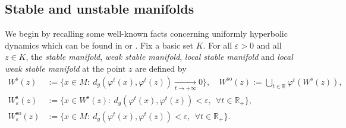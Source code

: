 \documentclass[11pt]{article}
\newcommand{\rs}{\mathrm{s}}
\newcommand{\rso}{\mathrm{so}}
\theoremstyle{definition}
\theoremstyle{plain}
\newcommand{\R}{\mathbb{R}}
\begin{document}
\subsection{Stable and unstable manifolds} We begin by recalling some well-known facts concerning uniformly hyperbolic dynamics which can be found in \cite{katok-hasselblatt} or \cite{dyatlov}. Fix a basic set $K$. For all $\varepsilon > 0$ and all $z \in K$, the \textit{stable manifold}, \textit{weak stable manifold}, \textit{local stable manifold} and \textit{local weak stable manifold} at the point $z$ are defined by
\begin{align*}
W^\rs (z) &:= \{ x \in M: \: d_g(\varphi^t(x), \varphi^t(z)) \underset{t \to+\infty}{\to} 0 \}, \quad W^{\rso} (z):= \bigcup_{t \in \R} \varphi^t \left(W^\rs (z) \right), \\
W_{\varepsilon}^\rs (z) &:= \{ x \in W^\rs (z): \: d_g(\varphi^t(x), \varphi^t(z)) < \varepsilon, \: \: \forall t \in \R_+ \},\\
W_{\varepsilon}^{\rso} (z) &:= \{ x \in M: \: d_g(\varphi^t(x), \varphi^t(z)) < \varepsilon, \: \: \forall t \in \R_+ \}.
\end{align*}
\end{document}
